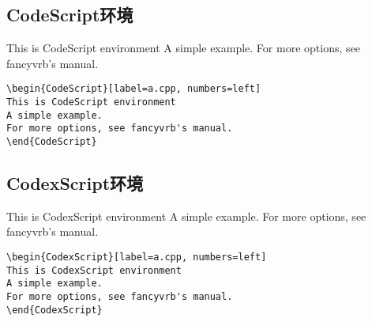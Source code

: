 \subsection{CodeScript环境}
\begin{minipage}{\textwidth}
\begin{minipage}{0.4\textwidth}
\begin{CodeScript}[label=a.cpp, numbers=left]
This is CodeScript environment
A simple example.
For more options, see fancyvrb's manual.
\end{CodeScript}
\end{minipage}
\hfill\begin{minipage}{0.4\textwidth}
\begin{Verbatim}[fontsize=\scriptsize,baselinestretch=0.9,xleftmargin=3mm,frame=lines,labelposition=all,framesep=5pt]
\begin{CodeScript}[label=a.cpp, numbers=left]
This is CodeScript environment
A simple example.
For more options, see fancyvrb's manual.
\end{CodeScript}
\end{Verbatim}
\end{minipage}
\end{minipage}

\subsection{CodexScript环境}
\begin{minipage}{\textwidth}
\begin{minipage}{0.4\textwidth}
\begin{CodexScript}[label=a.cpp, numbers=left]
This is CodexScript environment
A simple example.
For more options, see fancyvrb's manual.
\end{CodexScript}
\end{minipage}
\hfill\begin{minipage}{0.4\textwidth}
\begin{Verbatim}[fontsize=\scriptsize,baselinestretch=0.9,xleftmargin=3mm,frame=lines,labelposition=all,framesep=5pt]
\begin{CodexScript}[label=a.cpp, numbers=left]
This is CodexScript environment
A simple example.
For more options, see fancyvrb's manual.
\end{CodexScript}
\end{Verbatim}
\end{minipage}
\end{minipage}

